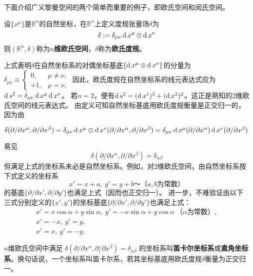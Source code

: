 下面介绍广义黎曼空间的两个简单而重要的例子，即欧氏空间和闵氏空间。

\begin{definition}
设$\{x^\mu\}$是$\mathbb{R}^n$的自然坐标，在$\mathbb{R}^n$上定义度规张量场$\delta$为
$$\delta := \delta_{\mu\nu}\operatorname{d} x^\mu\otimes\operatorname{d} x^\nu$$
则$(\mathbb{R}^n, \delta)$称为\textbf{$n$维欧氏空间}，$\delta$称为\textbf{欧氏度规}。
\end{definition}

上式表明$\delta$在自然坐标系的对偶坐标基底$\{\operatorname{d} x^\mu\otimes\operatorname{d} x^\nu\}$的分量为
$
\delta_{\mu\nu} \equiv
\begin{cases}
0, & \mu \neq \nu, \\
+1, & \mu = \nu,
\end{cases}
$
因此，欧氏度规在自然坐标系的线元表达式应为$\operatorname{d} s^2 = \delta_{\mu\nu}\operatorname{d} x^\mu\operatorname{d} x^\nu$。
若$n = 2$，便有$\operatorname{d} s^2 = (\operatorname{d} x^1)^2 + (\operatorname{d} x^2)^2$。这正是熟知的$2$维欧氏空间的线元表达式。
由定义可知自然坐标基底用欧氏度规衡量是正交归一的，因为由

$\delta(\partial / \partial x^\alpha, \partial / \partial x^\beta) = \delta_{\mu\nu}\operatorname{d} x^\mu\otimes\operatorname{d} x^\nu(\partial / \partial  x^\alpha, \partial / \partial x^\beta) = \delta_{\mu\nu}\operatorname{d} x^\mu(\partial / \partial x^\alpha)\operatorname{d} x^\nu(\partial / \partial x^\beta)$

易见$$\delta(\partial / \partial x^\alpha, \partial / \partial x^\beta) = \delta_{\alpha\beta}$$
但满足上式的坐标系未必是自然坐标系。例如，对$2$维欧氏空间，由自然坐标系按下式定义的坐标系
$$x' = x + a, ~ y' = y +b ～ \text{（$a, b$为常数）}$$
的基底$\{\partial / \partial x', \partial / \partial y'\}$也满足上式（因而也正交归一）。
进一步，不难验证由以下三式分别定义的$\{x', y'\}$的坐标基底$\{\partial / \partial x', \partial / \partial y'\}$也满足上式：
\begin{gather*}
x' = x\cos\alpha + y\sin\alpha, ~ y' = -x\sin\alpha + y\cos\alpha ~ \text{（$\alpha$为常数）}, \\
x' = -x, ~ y' = y, \\
x' = x, ~ y' = -y.
\end{gather*}

\begin{definition}
$n$维欧氏空间中满足
$\delta(\partial / \partial x^\alpha, \partial / \partial x^\beta) = \delta_{\alpha\beta}$
的坐标系叫\textbf{笛卡尔坐标系}或\textbf{直角坐标系}。换句话说，一个坐标系叫笛卡尔系，若其坐标基底用欧氏度规$\delta$衡量为正交归一。
\end{definition}

